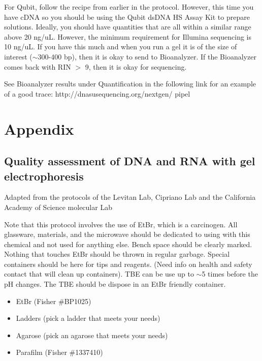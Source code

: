 \documentclass[11pt, oneside]{article}
\begin{document}
		\noindent For Qubit, follow the recipe from earlier in the protocol. However, this time you have cDNA so you should be using the Qubit dsDNA HS 		Assay Kit to prepare solutions. Ideally, you should have quantities that are all within a similar range above 20 ng/uL. However, the minimum 			requirement for Illumina sequencing is 10 ng/uL. If you have this much and when you run a gel it is of the size of interest ($\sim$300-400 bp), then 		it is okay to send to Bioanalyzer. If the Bioanalyzer comes back with RIN $>$ 9, then it is okay for sequencing. 

		\noindent See Bioanalyzer results under Quantification in the following link for an example of a good trace: http://dnasusequencing.org/nextgen/		pipel
		
		\newpage
		
\section {Appendix}

	\subsection{Quality assessment of DNA and RNA with gel electrophoresis}

		\begin{adjustwidth}{0.25in}{0pt} Adapted from the protocols of the Levitan Lab, Cipriano Lab and the California Academy of Science molecular Lab 		\end{adjustwidth}

		\vspace{5mm}
	
	
		\noindent Note that this protocol involves the use of EtBr, which is a carcinogen.  All glassware, materials, and the microwave should be dedicated 		to using with this chemical and not used for anything else.  Bench space should be clearly marked.  Nothing that touches EtBr should be thrown in 		regular garbage. Special containers should be here for tips and reagents.  (Need info on health and safety contact that will clean up containers). 		TBE can be use up to $\sim$5 times before the pH changes. The TBE should be dispose in an EtBr friendly container. 
	
		\vspace{3mm}
		
		
		\begin{itemize}
			\itemsep0em
			\item EtBr (Fisher \#BP1025)
			\item Ladders (pick a ladder that meets your needs)
			\item	Agarose (pick an agarose that meets your needs)
			\item Parafilm (Fisher \#1337410)
		\end{itemize}
			
\end{document}
